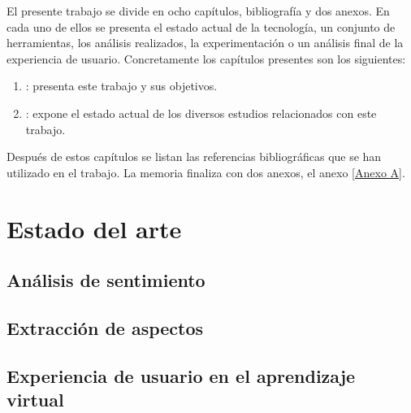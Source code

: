 \documentclass[11pt,english,listoffigures,listoftables]{tfgetsinf}
\begin{document}
El presente trabajo se divide en ocho capítulos, bibliografía y dos anexos. En cada uno de ellos se presenta el estado actual de la tecnología, un conjunto de herramientas, los análisis realizados, la experimentación o un análisis final de la experiencia de usuario. Concretamente los capítulos presentes son los siguientes:
\begin{enumerate}
   \item {}: presenta este trabajo y sus objetivos.
   \item {}: expone el estado actual de los diversos estudios relacionados con este trabajo.
\end{enumerate}

Después de estos capítulos se listan las referencias bibliográficas que se han utilizado en el trabajo. La memoria finaliza con dos anexos, el anexo \ref{Anexo A}.





\chapter{Estado del arte} \label{EstadoArte} 
\cite{MVS2000}

\section{Análisis de sentimiento}


\section{Extracción de aspectos}

\section{Experiencia de usuario en el aprendizaje virtual}


\end{document}
